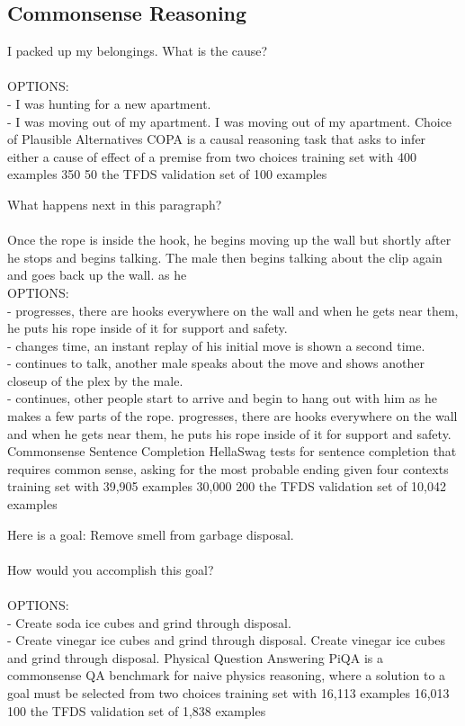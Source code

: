 \clearpage 
\subsection{Commonsense Reasoning}\label{appen:b-commonsense}

\taskio
{I packed up my belongings. What is the cause?\\\\OPTIONS:\\- I was hunting for a new apartment.\\- I was moving out of my apartment.}
{I was moving out of my apartment.}
{
    \taskdescription
    {Choice of Plausible Alternatives} %
    {COPA} %
    {\citep{SSS112418}} %
    {is a causal reasoning task that asks to infer either a cause of effect of a premise from two choices} %
    {training set with 400 examples} %
    {350} %
    {50} %
    {the TFDS validation set of 100 examples} %
}

\taskio
{What happens next in this paragraph?\\\\Once the rope is inside the hook, he begins moving up the wall but shortly after he stops and begins talking. The male then begins talking about the clip again and goes back up the wall. as he\\OPTIONS:\\- progresses, there are hooks everywhere on the wall and when he gets near them, he puts his rope inside of it for support and safety.\\- changes time, an instant replay of his initial move is shown a second time.\\- continues to talk, another male speaks about the move and shows another closeup of the plex by the male.\\- continues, other people start to arrive and begin to hang out with him as he makes a few parts of the rope.}
{progresses, there are hooks everywhere on the wall and when he gets near them, he puts his rope inside of it for support and safety.}
{
\taskdescription
    {Commonsense Sentence Completion} %
    {HellaSwag} %
    {\citep{zellers-etal-2019-hellaswag}} %
    {tests for sentence completion that requires common sense, asking for the most probable ending given four contexts} %
    {training set with 39,905 examples} %
    {30,000} %
    {200} %
    {the TFDS validation set of 10,042 examples} %
}

\taskio
{Here is a goal: Remove smell from garbage disposal.\\\\How would you accomplish this goal?\\\\OPTIONS:\\- Create soda ice cubes and grind through disposal.\\- Create vinegar ice cubes and grind through disposal.}
{Create vinegar ice cubes and grind through disposal.}
{
    \taskdescription
    {Physical Question Answering} %
    {PiQA} %
    {\citep{Bisk2020}} %
    {is a commonsense QA benchmark for naive physics reasoning, where a solution to a goal must be selected from two choices} %
    {training set with 16,113 examples} %
    {16,013} %
    {100} %
    {the TFDS validation set of 1,838 examples} %
}

